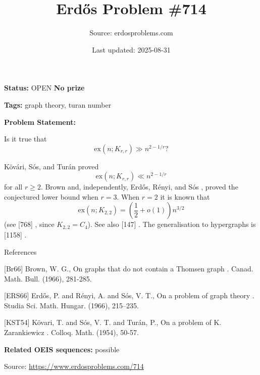 \documentclass{article}
\title{Erd\H{o}s Problem \#714}
\date{Last updated: 2025-08-31}
\author{Source: erdosproblems.com}
\begin{document}
\maketitle

\noindent\textbf{Status:} OPEN \quad \textbf{No prize}

\noindent\textbf{Tags:} graph theory, turan number

\medskip

\noindent\textbf{Problem Statement:}

Is it true that\[\mathrm{ex}(n; K_{r,r}) \gg n^{2-1/r}?\]




K\"{o}v\'{a}ri, S\'{o}s, and Tur\'{a}n \cite{KST54} proved\[\mathrm{ex}(n; K_{r,r}) \ll n^{2-1/r}\]for all $r\geq 2$. Brown \cite{Br66} and, independently, Erd\H{o}s, R\'{e}nyi, and S\'{o}s \cite{ERS66}, proved the conjectured lower bound when $r=3$. When $r=2$ it is known that\[\mathrm{ex}(n;K_{2,2})=\left(\frac{1}{2}+o(1)\right)n^{3/2}\](see [768] , since $K_{2,2}=C_4$). See also [147] . The generalisation to hypergraphs is [1158] .




References

[Br66] Brown, W. G., On graphs that do not contain a Thomsen graph . Canad. Math. Bull. (1966), 281-285.

[ERS66] Erd\H{o}s, P. and R\'{e}nyi, A. and S\'os, V. T., On a problem of graph theory . Studia Sci. Math. Hungar. (1966), 215--235.

[KST54] K\"{o}vari, T. and S\'{o}s, V. T. and Tur\'{a}n, P., On a problem of K. Zarankiewicz . Colloq. Math. (1954), 50-57.

\noindent\textbf{Related OEIS sequences:} possible


\bigskip
\noindent\small{Source: \url{https://www.erdosproblems.com/714}}
\end{document}
